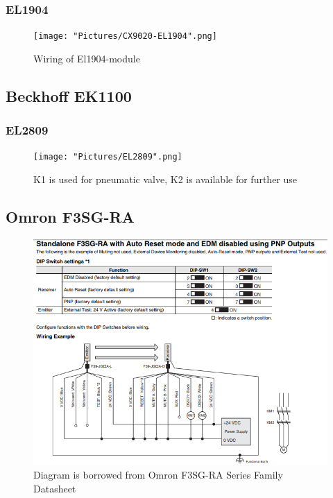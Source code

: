\documentclass{article}
\begin{document}
    \subsubsection{EL1904}
    
    \begin{figure}[!h]
        \centering
        \texttt{[image: "Pictures/CX9020-EL1904".png]}
        \caption{Wiring of El1904-module}
    \end{figure}
    
    \newpage
    
    \subsection{Beckhoff EK1100}
    \subsubsection{EL2809}
    
    \begin{figure}[!h]
        \centering
        \texttt{[image: "Pictures/EL2809".png]}
        \caption{K1 is used for pneumatic valve, K2 is available for further use}
    \end{figure}
    
    \newpage
    
    \subsection{Omron F3SG-RA}
    
    \begin{figure}[!h]
        \centering
        \includegraphics[width=\textwidth]{Pictures/F3SG-RA.png}
        \caption{Diagram is borrowed from Omron F3SG-RA Series Family Datasheet}
        \label{fig:my_label}
    \end{figure}
    
 
    
    
        
\end{document}

